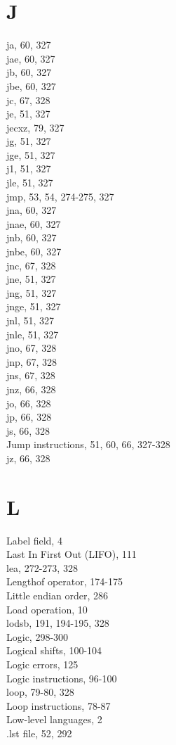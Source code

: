 \documentclass[10pt]{article}
\begin{document}
\section*{J}
ja, 60, 327\\
jae, 60, 327\\
jb, 60, 327\\
jbe, 60, 327\\
jc, 67, 328\\
je, 51, 327\\
jecxz, 79, 327\\
jg, 51, 327\\
jge, 51, 327\\
j1, 51, 327\\
jle, 51, 327\\
jmp, 53, 54, 274-275, 327\\
jna, 60, 327\\
jnae, 60, 327\\
jnb, 60, 327\\
jnbe, 60, 327\\
jnc, 67, 328\\
jne, 51, 327\\
jng, 51, 327\\
jnge, 51, 327\\
jnl, 51, 327\\
jnle, 51, 327\\
jno, 67, 328\\
jnp, 67, 328\\
jns, 67, 328\\
jnz, 66, 328\\
jo, 66, 328\\
jp, 66, 328\\
js, 66, 328\\
Jump instructions, 51, 60, 66, 327-328\\
jz, 66, 328

\section*{L}
Label field, 4\\
Last In First Out (LIFO), 111\\
lea, 272-273, 328\\
Lengthof operator, 174-175\\
Little endian order, 286\\
Load operation, 10\\
lodsb, 191, 194-195, 328\\
Logic, 298-300\\
Logical shifts, 100-104\\
Logic errors, 125\\
Logic instructions, 96-100\\
loop, 79-80, 328\\
Loop instructions, 78-87\\
Low-level languages, 2\\
.lst file, 52, 292
\end{document}
